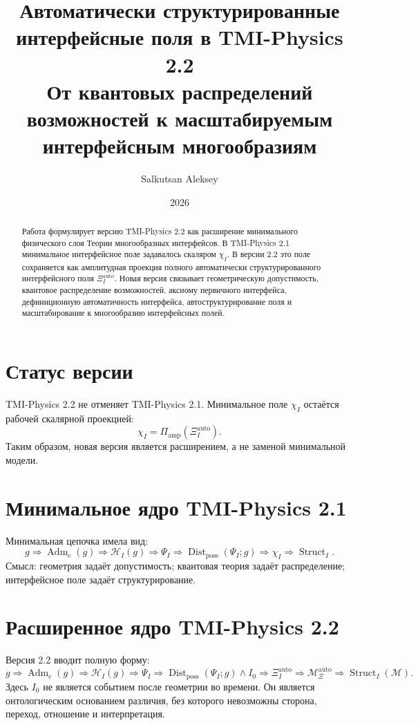 \documentclass[12pt,a4paper]{article}
\title{\textbf{Автоматически структурированные интерфейсные поля в TMI-Physics 2.2}\\
\large От квантовых распределений возможностей к масштабируемым интерфейсным многообразиям}
\author{Salkutsan Aleksey}
\date{2026}
\DeclareMathOperator{\Adm}{Adm}
\DeclareMathOperator{\Struct}{Struct}
\DeclareMathOperator{\Dist}{Dist}
\newcommand{\M}{\mathcal M}
\newcommand{\Hcal}{\mathcal H}
\newcommand{\XiAuto}{\Xi_I^{\mathrm{auto}}}
\newcommand{\XiMan}{\mathcal M_{\Xi}^{\mathrm{auto}}}
\newcommand{\PiAmp}{\Pi_{\mathrm{amp}}}
\begin{document}
\maketitle
\begin{abstract}
Работа формулирует версию TMI-Physics 2.2 как расширение минимального физического слоя Теории многообразных интерфейсов. В TMI-Physics 2.1 минимальное интерфейсное поле задавалось скаляром \(\chi_I\). В версии 2.2 это поле сохраняется как амплитудная проекция полного автоматически структурированного интерфейсного поля \(\Xi_I^{\mathrm{auto}}\). Новая версия связывает геометрическую допустимость, квантовое распределение возможностей, аксиому первичного интерфейса, дефиниционную автоматичность интерфейса, автоструктурирование поля и масштабирование к многообразию интерфейсных полей.
\end{abstract}
\tableofcontents
\newpage

\section{Статус версии}
TMI-Physics 2.2 не отменяет TMI-Physics 2.1. Минимальное поле \(\chi_I\) остаётся рабочей скалярной проекцией:
\begin{equation}
\boxed{\chi_I=\PiAmp(\XiAuto).}
\end{equation}
Таким образом, новая версия является расширением, а не заменой минимальной модели.

\section{Минимальное ядро TMI-Physics 2.1}
Минимальная цепочка имела вид:
\begin{equation}
\boxed{g\Rightarrow\Adm_c(g)\Rightarrow\Hcal_I(g)\Rightarrow\Psi_I\Rightarrow\Dist_{\mathrm{poss}}(\Psi_I;g)\Rightarrow\chi_I\Rightarrow\Struct_I.}
\end{equation}
Смысл: геометрия задаёт допустимость; квантовая теория задаёт распределение; интерфейсное поле задаёт структурирование.

\section{Расширенное ядро TMI-Physics 2.2}
Версия 2.2 вводит полную форму:
\begin{equation}
\boxed{g\Rightarrow\Adm_c(g)\Rightarrow\Hcal_I(g)\Rightarrow\Psi_I\Rightarrow\Dist_{\mathrm{poss}}(\Psi_I;g)\land I_0\Rightarrow\XiAuto\Rightarrow\XiMan\Rightarrow\Struct_I(\M).}
\end{equation}
Здесь \(I_0\) не является событием после геометрии во времени. Он является онтологическим основанием различия, без которого невозможны сторона, переход, отношение и интерпретация.
\end{document}
